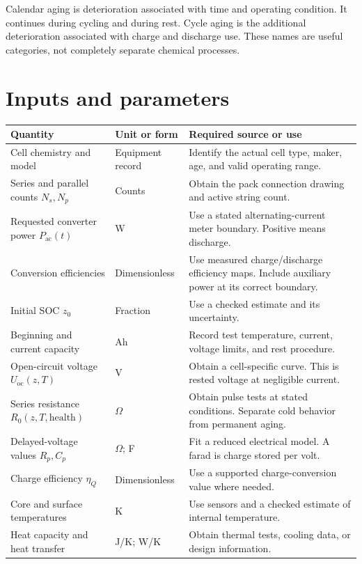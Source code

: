 \documentclass[11pt,a4paper]{report}
\begin{document}
Calendar aging is deterioration associated with time and operating condition.
It continues during cycling and during rest.
Cycle aging is the additional deterioration associated with charge and discharge use.
These names are useful categories, not completely separate chemical processes.

\section{Inputs and parameters}
\begin{longtable}{L{0.22\textwidth}L{0.17\textwidth}L{0.49\textwidth}}
\toprule Quantity & Unit or form & Required source or use \\ \midrule\endhead
Cell chemistry and model & Equipment record & Identify the actual cell type, maker, age, and valid operating range. \\
Series and parallel counts $N_s,N_p$ & Counts & Obtain the pack connection drawing and active string count. \\
Requested converter power $P_{\mathrm{ac}}(t)$ & W & Use a stated alternating-current meter boundary. Positive means discharge. \\
Conversion efficiencies & Dimensionless & Use measured charge/discharge efficiency maps. Include auxiliary power at its correct boundary. \\
Initial SOC $z_0$ & Fraction & Use a checked estimate and its uncertainty. \\
Beginning and current capacity & Ah & Record test temperature, current, voltage limits, and rest procedure. \\
Open-circuit voltage $U_{\mathrm{oc}}(z,T)$ & V & Obtain a cell-specific curve. This is rested voltage at negligible current. \\
Series resistance $R_0(z,T,\mathrm{health})$ & $\Omega$ & Obtain pulse tests at stated conditions. Separate cold behavior from permanent aging. \\
Delayed-voltage values $R_p,C_p$ & $\Omega$; F & Fit a reduced electrical model. A farad is charge stored per volt. \\
Charge efficiency $\eta_Q$ & Dimensionless & Use a supported charge-conversion value where needed. \\
Core and surface temperatures & K & Use sensors and a checked estimate of internal temperature. \\
Heat capacity and heat transfer & J/K; W/K & Obtain thermal tests, cooling data, or design information. \\

\end{longtable}
\end{document}
